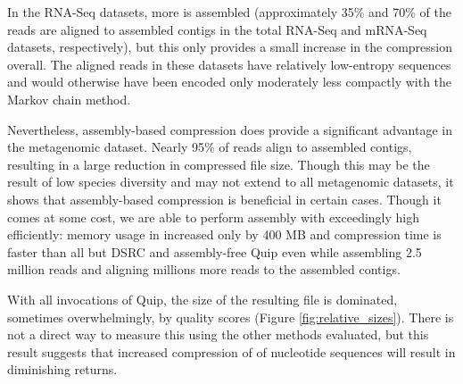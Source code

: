 \documentclass[a4,center,fleqn]{NAR}
\begin{document}
In the RNA-Seq datasets, more is assembled (approximately 35\% and 70\% of the
reads are aligned to assembled contigs in the total RNA-Seq and mRNA-Seq
datasets, respectively), but this only provides a small increase in the
compression overall. The aligned reads in these datasets have relatively
low-entropy sequences and would otherwise have been encoded only moderately less
compactly with the Markov chain method.

Nevertheless, assembly-based compression does provide a significant advantage
in the metagenomic dataset. Nearly 95\% of reads align to assembled contigs,
resulting in a large reduction in compressed file size. Though this may be the
result of low species diversity and may not extend to all metagenomic
datasets, it shows that assembly-based compression is beneficial in certain
cases. Though it comes at some cost, we are able to perform assembly with
exceedingly  high efficiently: memory usage in increased only by 400 MB and
compression time is faster than all but DSRC and assembly-free Quip even while
assembling 2.5 million reads and aligning millions more reads to the assembled
contigs.

With all invocations of Quip, the size of the resulting file is dominated,
sometimes overwhelmingly, by quality scores (Figure \ref{fig:relative_sizes}).
There is not a direct way to measure this using the other methods evaluated,
but this result suggests that increased compression of of nucleotide sequences
will result in diminishing returns.



\begin{table}
\end{table}
\end{document}
